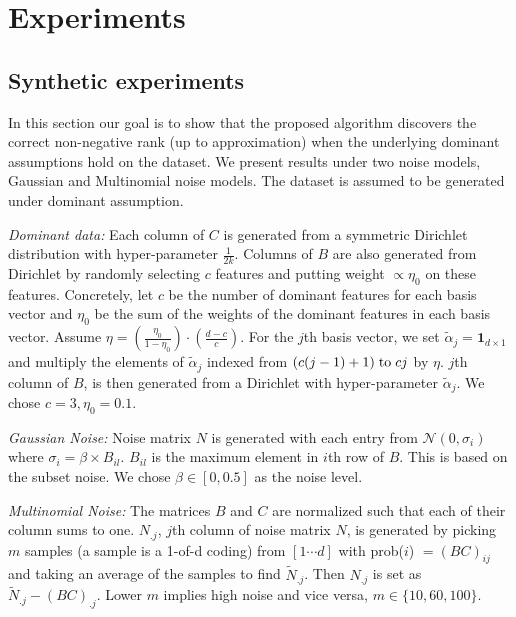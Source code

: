 \section{Experiments}

\subsection{Synthetic experiments}
In this section our goal is to show that the proposed algorithm discovers the correct non-negative rank (up to approximation) when the underlying dominant assumptions hold on the dataset. We present results under two noise models, Gaussian and Multinomial noise models. The dataset is assumed to be generated under dominant assumption.

\textit{Dominant data:} 
Each column of $C$ is generated from a symmetric Dirichlet distribution with hyper-parameter $\frac{1}{2k}$.
Columns of $B$ are also generated from Dirichlet by randomly selecting $c$ features and putting weight $\propto \eta_0$ on these features.
Concretely, let $c$ be the number of dominant features for each basis vector and $\eta_{0}$ be the sum of the weights of the dominant features in each basis vector.
Assume $\eta = (\frac{\eta_{0}}{1-\eta_{0}})\cdot(\frac{d-c}{c})$.
For the $j$th basis vector, we set $\widetilde{\alpha}_{j} = \textbf{1}_{d \times 1}$ and multiply the elements of $\widetilde{\alpha}_{j}$ indexed from $(c(j-1)+1) \hspace{1mm}\text{to}\hspace{1mm} cj$ by $\eta$.
$j$th column of $B$, is then generated from a Dirichlet with hyper-parameter $\widetilde{\alpha}_{j}$. We chose $c = 3, \eta_0=0.1.$

\textit{Gaussian Noise: } 
Noise matrix $N$ is generated with each entry from $\mathcal{N}(0,\sigma_{i})$ where $\sigma_{i}=\beta \times B_{il}$. $B_{il}$ is the maximum element in $i$th row of $B$.
This is based on the subset noise. We chose $\beta \in [0 , 0.5]$ as the noise level.

\textit{Multinomial Noise: }
The matrices $B$ and $C$ are normalized such that each of their column sums to one.
$N_{.j}$, $j$th column of noise matrix $N$, is generated by picking $m$ samples (a sample is a 1-of-d coding) from $ [1\cdots d]$ with prob($i$) $= (BC)_{ij}$ and taking an average of the samples to find $\tilde{N}_{.j}$. Then $N_{.j}$ is set as $\tilde{N}_{.j}-(BC)_{.j}$.
Lower $m$ implies high noise and vice versa, $m \in \{10,60,100\}$.


